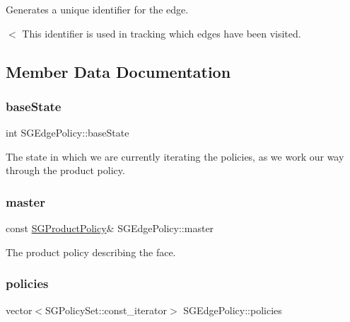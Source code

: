 Generates a unique identifier for the edge. 

$<$ This identifier is used in tracking which edges have been visited. 

\subsection{Member Data Documentation}
\mbox{\label{classSGEdgePolicy_a28dccfb7e5195256e2ca6ababb03b45f}} 
\subsubsection{\texorpdfstring{base\+State}{baseState}}
{\footnotesize\ttfamily int S\+G\+Edge\+Policy\+::base\+State\hspace{0.3cm}{\ttfamily [private]}}

The state in which we are currently iterating the policies, as we work our way through the product policy. \mbox{\label{classSGEdgePolicy_a78e0d811ff7c8847af1f84de160f8ec9}} 
\subsubsection{\texorpdfstring{master}{master}}
{\footnotesize\ttfamily const \hyperlink{classSGProductPolicy}{S\+G\+Product\+Policy}\& S\+G\+Edge\+Policy\+::master\hspace{0.3cm}{\ttfamily [private]}}

The product policy describing the face. \mbox{\label{classSGEdgePolicy_a4e18fb2c342c4349a89a2a47b5dc9f18}} 
\subsubsection{\texorpdfstring{policies}{policies}}
{\footnotesize\ttfamily vector$<$S\+G\+Policy\+Set\+::const\+\_\+iterator$>$ S\+G\+Edge\+Policy\+::policies\hspace{0.3cm}{\ttfamily [private]}}

